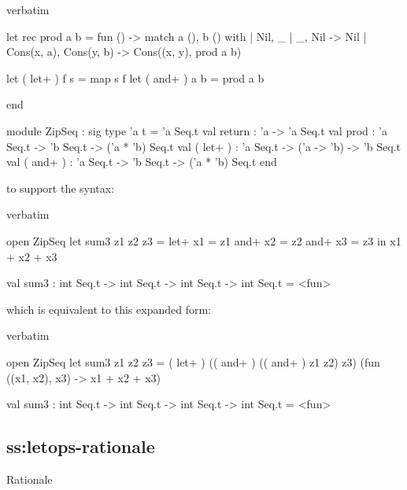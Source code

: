 {\begin{camlexample}{verbatim}
\begin{caml}
\begin{camlinput}
  let rec prod a b =
    fun () ->
      match a (), b () with
      | Nil, _ | _, Nil -> Nil
      | Cons(x, a), Cons(y, b) -> Cons((x, y), prod a b)

  let ( let+ ) f s = map s f
  let ( and+ ) a b = prod a b

end
\end{camlinput}
\begin{camloutput}
module ZipSeq :
  sig
    type 'a t = 'a Seq.t
    val return : 'a -> 'a Seq.t
    val prod : 'a Seq.t -> 'b Seq.t -> ('a * 'b) Seq.t
    val ( let+ ) : 'a Seq.t -> ('a -> 'b) -> 'b Seq.t
    val ( and+ ) : 'a Seq.t -> 'b Seq.t -> ('a * 'b) Seq.t
  end
\end{camloutput}
\end{caml}
\end{camlexample}

to support the syntax:

\begin{camlexample}{verbatim}
\begin{caml}
\begin{camlinput}
open ZipSeq
let sum3 z1 z2 z3 =
  let+ x1 = z1
  and+ x2 = z2
  and+ x3 = z3 in
    x1 + x2 + x3
\end{camlinput}
\begin{camloutput}
val sum3 : int Seq.t -> int Seq.t -> int Seq.t -> int Seq.t = <fun>
\end{camloutput}
\end{caml}
\end{camlexample}

which is equivalent to this expanded form:

\begin{camlexample}{verbatim}
\begin{caml}
\begin{camlinput}
open ZipSeq
let sum3 z1 z2 z3 =
  ( let+ ) (( and+ ) (( and+ ) z1 z2) z3)
    (fun ((x1, x2), x3) -> x1 + x2 + x3)
\end{camlinput}
\begin{camloutput}
val sum3 : int Seq.t -> int Seq.t -> int Seq.t -> int Seq.t = <fun>
\end{camloutput}
\end{caml}
\end{camlexample}

\subsection{ss:letops-rationale}{Rationale}

}
